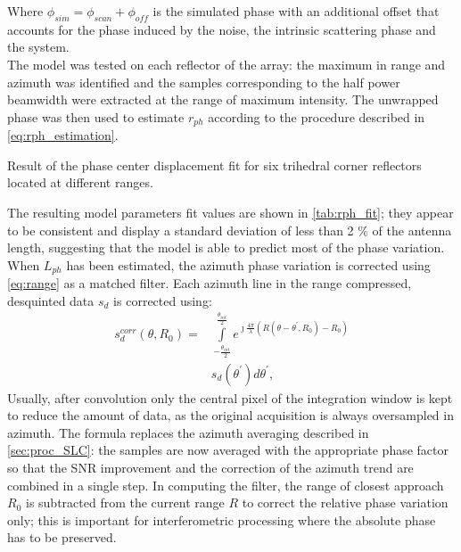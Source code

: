 Where $\phi_{sim} = \phi_{scan} + \phi_{off}$ is the simulated phase with an additional offset that accounts for the phase induced by the noise, the intrinsic scattering phase and the system.\\
The model was tested on each reflector of the array: the maximum in range and azimuth was identified and the samples corresponding to the half power beamwidth were extracted at the range of maximum intensity. The unwrapped phase was then used to estimate $r_{ph}$ according to the procedure described in \autoref{eq:rph_estimation}.



\begin{table}[ht]
	\centering
	\caption{Result of the phase center displacement fit for six trihedral corner reflectors located at different ranges.}
	\label{tab:rph_fit}
\end{table}
The resulting model parameters fit values  are shown in \autoref{tab:rph_fit}; they appear to be consistent and display a standard deviation of less than 2 \% of the antenna length, suggesting that the model is able to predict most of the phase variation.\\
When $L_{ph}$ has been estimated, the azimuth phase variation is corrected using \autoref{eq:range} as a matched filter. Each azimuth line in the range compressed, desquinted data $s_{d}$ is corrected using:
\begin{equation}\label{eq:correction}
	\begin{aligned}
		s_{d}^{corr}\left(\theta, R_{0}\right) = &\int\limits_{-\frac{\theta_{int}}{2}}^{\frac{\theta_{int}}{2}}e^{\jmath \frac{4\pi}{\lambda}\left(R\left(\theta - \theta^{\prime}, R_{0}\right) - R_{0}\right)}\\
		&s_{d}\left(\theta^\prime\right) d\theta^\prime,
	\end{aligned}
\end{equation}
Usually, after convolution only the central pixel of the integration window is kept to reduce the amount of data, as the original acquisition is always oversampled in azimuth.
The formula replaces the azimuth averaging described in \autoref{sec:proc_SLC}: the samples are now averaged with the appropriate phase factor so that the SNR improvement and the correction of the azimuth trend are combined in a single step. In computing the filter, the range of closest approach $R_{0}$ is subtracted from the current range $R$ to correct the relative phase variation only; this is important for interferometric processing where the absolute phase has to be preserved.\\

